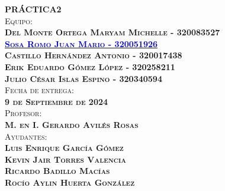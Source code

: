 \begin{titlepage}
\begin{minipage}[c][0.81\textheight][t]{0.75\textwidth}
\begin{center}
			\textsc{\LARGE \textbf{P}\hspace{1cm}\textbf{R}\hspace{1cm}\textbf{Á}\hspace{1cm}\textbf{C}\hspace{1cm}\textbf{T}\hspace{1cm}\textbf{I}\hspace{1cm}\textbf{C}\hspace{1cm}\textbf{A}\hspace{1.3cm}\textbf{2}}\\[2cm]
			\textsc{\Large{Equipo:}\normalsize \\
                \vspace{.3cm}
				\textbf{Del Monte Ortega Maryam Michelle - 320083527 \\
                \vspace{.2cm}
				\href{https://github.com/JuanSosaCiencias}{\textcolor{blue}{Sosa Romo Juan Mario - 320051926}} \\
                \vspace{.2cm}
				Castillo Hernández Antonio - 320017438 \\
                \vspace{.2cm}
                Erik Eduardo Gómez López - 320258211 \\
                \vspace{.2cm}
                Julio César Islas Espino - 320340594}}\\[0.5cm]     
			
			\textsc{{Fecha de entrega: \\ \textbf{9 de Septiembre de 2024}}}\\[0.5cm]        
			
			\textsc{{Profesor: \\ \textbf{M. en I. Gerardo Avilés Rosas}}}\\[0.5cm]  
			
			\textsc{Ayudantes: \\ \textbf{Luis Enrique García Gómez \\ Kevin Jair Torres Valencia \\ Ricardo Badillo Macías \\ Rocío Aylin Huerta González
			} }
			\vspace{0.5cm}
		\end{center}
	\end{minipage}
\end{titlepage}
